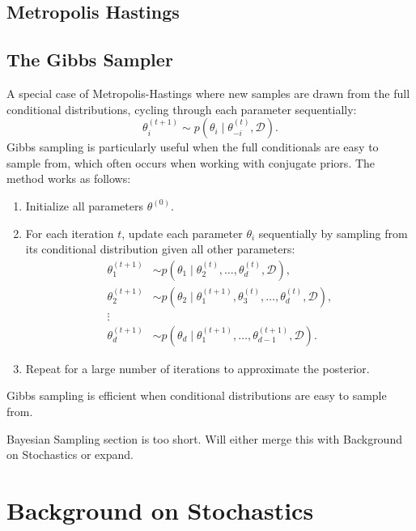 \documentclass[11pt, twoside]{report}
\begin{document}

\section{Metropolis Hastings}
\section{The Gibbs Sampler}
A special case of Metropolis-Hastings where new samples are drawn from the full conditional distributions, cycling through each parameter sequentially:
\begin{equation}
\theta_i^{(t+1)} \sim p(\theta_i \mid \theta_{-i}^{(t)}, \mathcal{D}).
\end{equation}
Gibbs sampling is particularly useful when the full conditionals are easy to sample from, which often occurs when working with conjugate priors. The method works as follows:
\begin{enumerate}
\item Initialize all parameters $\theta^{(0)}$.
\item For each iteration $t$, update each parameter $\theta_i$ sequentially by sampling from its conditional distribution given all other parameters:
\begin{align*}
    \theta_1^{(t+1)} &\sim p(\theta_1 \mid \theta_2^{(t)}, \dots, \theta_d^{(t)}, \mathcal{D}), \\
    \theta_2^{(t+1)} &\sim p(\theta_2 \mid \theta_1^{(t+1)}, \theta_3^{(t)}, \dots, \theta_d^{(t)}, \mathcal{D}), \\
    \vdots \\
    \theta_d^{(t+1)} &\sim p(\theta_d \mid \theta_1^{(t+1)}, \dots, \theta_{d-1}^{(t+1)}, \mathcal{D}).
\end{align*}

\item Repeat for a large number of iterations to approximate the posterior.
\end{enumerate}
Gibbs sampling is efficient when conditional distributions are easy to sample from.


\begin{mdframed}[hidealllines=true,backgroundcolor=yellow!20]
    Bayesian Sampling section is too short. Will either merge this with Background on Stochastics or expand.
\end{mdframed}



\chapter{Background on Stochastics}
\end{document}

